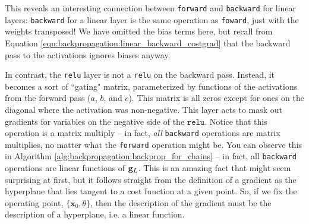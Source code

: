 \begin{figure}[h]
\end{figure}

This reveals an interesting connection between \texttt{forward} and \texttt{backward} for linear layers: \texttt{backward} for a linear layer is the same operation as \texttt{foward}, just with the weights transposed! We have omitted the bias terms here, but recall from Equation \ref{eqn:backpropagation:linear_backward_costgrad} that the backward pass to the activations ignores biases anyway.

In contrast, the \texttt{relu} layer is not a \texttt{relu} on the backward pass. Instead, it becomes a sort of ``gating" matrix, parameterized by functions of the activations from the forward pass ($a$, $b$, and $c$). This matrix is all zeros except for ones on the diagonal where the activation was non-negative. This layer acts to mask out gradients for variables on the negative side of the $\texttt{relu}$. Notice that this operation is a matrix multiply -- in fact, \textit{all} \texttt{backward} operations are matrix multiplies, no matter what the \texttt{forward} operation might be. You can observe this in Algorithm \ref{alg:backpropagation:backprop_for_chains} -- in fact, all \texttt{backward} operations are linear functions of $\mathbf{g}_L$. This is an amazing fact that might seem surprising at first, but it follows straight from the definition of a gradient as the hyperplane that lies tangent to a cost function at a given point. So, if we fix the operating point, $\{\mathbf{x}_0, \theta\}$, then the description of the gradient must be the description of a hyperplane, i.e. a linear function.


